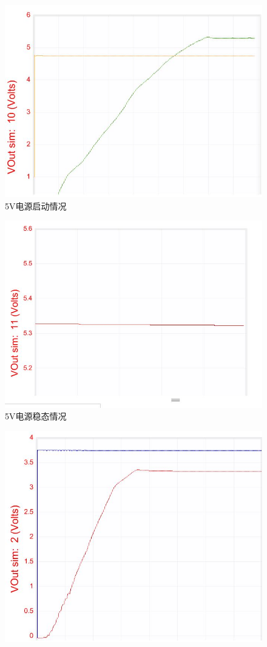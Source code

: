 \documentclass[a4paper]{paper}
\begin{document}
\begin{multicols}{2}
    \begin{figure}[H]
        \centering
        \includegraphics[width = 0.8\columnwidth]{5sim1.jpg}
        \caption{5V电源启动情况}
    \end{figure}
    \begin{figure}[H]
        \centering
        \includegraphics[width = 0.8\columnwidth]{5sim2.jpg}
        \caption{5V电源稳态情况}
    \end{figure}
    \begin{figure}[H]
        \centering
        \includegraphics[width = 0.8\columnwidth]{3sim1.jpg}

\end{figure}
\end{multicols}
\end{document}

